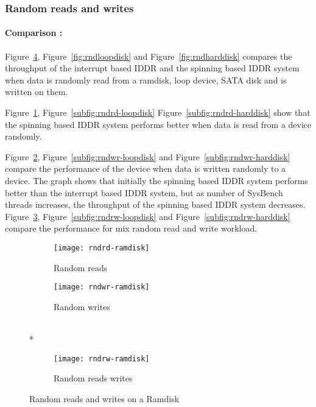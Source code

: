 \subsubsection*{Random reads and writes}

\paragraph{Comparison :}

Figure~\ref{fig:rndramdisk}, Figure~\ref{fig:rndloopdisk} and Figure~\ref{fig:rndharddisk} compares the throughput of the interrupt based IDDR and the spinning based IDDR system when data is randomly read from a ramdisk, loop device, SATA disk and is written on them.

Figure~\ref{subfig:rndrd-ramdisk}, Figure~\ref{subfig:rndrd-loopdisk} Figure~\ref{subfig:rndrd-harddisk} show that the spinning based IDDR system performs better when data is read from a device randomly.  

Figure~\ref{subfig:rndwr-ramdisk}, Figure~\ref{subfig:rndwr-loopdisk} and Figure~\ref{subfig:rndwr-harddisk} compare the performance of the device when data is written randomly to a device. The graph shows that initially the spinning based IDDR system performs better than the interrupt based IDDR system, but as number of SysBench threads increases, the throughput of the spinning based IDDR system decreases.
\\[3mm] 
Figure~\ref{subfig:rndrw-ramdisk}, Figure~\ref{subfig:rndrw-loopdisk} and Figure~\ref{subfig:rndrw-harddisk} compare the performance for mix random read and write workload. 

\begin{figure}[!ht]
  \begin{subfigure}[b]{0.2\textwidth}
  \texttt{[image: rndrd-ramdisk]}
  \caption{Random reads}
  \label{subfig:rndrd-ramdisk}
  \end{subfigure}
  \hspace{50mm}
  \begin{subfigure}[b]{0.2\textwidth}
  \texttt{[image: rndwr-ramdisk]}
  \caption{Random writes}
  \label{subfig:rndwr-ramdisk}
  \end{subfigure}\\*
  \hspace{150mm}
  \begin{subfigure}[b]{0.3\textwidth}
  \texttt{[image: rndrw-ramdisk]}
  \caption{Random reads writes}
  \label{subfig:rndrw-ramdisk}
  \end{subfigure}
  \caption{Random reads and writes on a Ramdisk}\label{fig:rndramdisk}
\end{figure}

